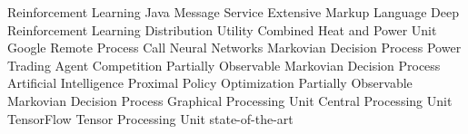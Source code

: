 \begin        {acronym}[Bash]

	       { Reinforcement Learning}
		 { Java Message Service}
		 { Extensive Markup Language}
	   { Deep Reinforcement Learning}
	       { Distribution Utility}
	      { Combined Heat and Power Unit}
	     { Google Remote Process Call}
	       { Neural Networks}
	      { Markovian Decision Process}
	 { Power Trading Agent Competition}
	    { Partially Observable Markovian Decision Process}
	       { Artificial Intelligence}
	      { Proximal Policy Optimization}
	    { Partially Observable Markovian Decision Process}
	      { Graphical Processing Unit}
	      { Central Processing Unit}
	       { TensorFlow}
	      { Tensor Processing Unit}
	     { state-of-the-art}

\end          {acronym}

